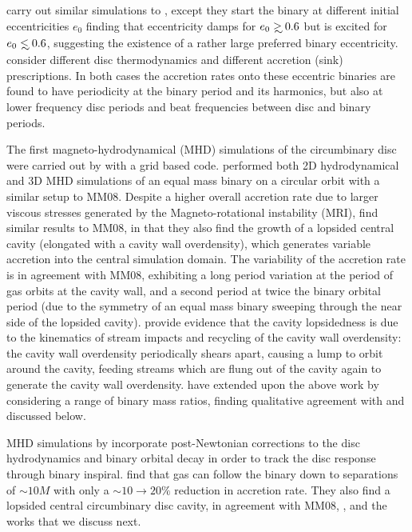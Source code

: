 \cite{Roedig:2012:Trqs} carry out similar simulations to \cite{Cuadra:2009}, except they start the binary at different initial eccentricities $e_0$ finding that eccentricity damps for $e_0 \gsim 0.6$ but is excited for $e_0 \lsim 0.6$, suggesting the existence of a rather large preferred binary eccentricity. \cite{Roedig:2011:eccevo} consider different disc thermodynamics and different accretion (sink) prescriptions. In both cases the accretion rates onto these eccentric binaries are found to have periodicity at the binary period and its harmonics, but also at lower frequency disc periods and beat frequencies between disc and binary periods.


The first magneto-hydrodynamical (MHD) simulations of the circumbinary disc
were carried out by \cite{ShiKrolik:2012} with a grid based code.
\cite{ShiKrolik:2012}  performed both 2D hydrodynamical and 3D MHD simulations
of an equal mass binary on a circular orbit with a similar setup to
MM08. Despite a higher overall accretion rate due to larger
viscous stresses generated by the Magneto-rotational instability (MRI),
\cite{ShiKrolik:2012} find similar results to MM08, in that they also find the
growth of a lopsided central cavity (elongated with a cavity wall
overdensity), which generates variable accretion into the central simulation
domain. The variability of the accretion rate is in agreement with MM08,
exhibiting a long period variation at the period of gas orbits at the cavity
wall, and a second period at twice the binary orbital period (due to the
symmetry of an equal mass binary sweeping through the near side of the lopsided
cavity). \cite{ShiKrolik:2012} provide evidence that the cavity lopsidedness is
due to the kinematics of stream impacts and recycling of the cavity wall
overdensity: the cavity wall overdensity periodically shears apart, causing a
lump to orbit around the cavity, feeding streams which are flung out of the
cavity again to generate the cavity wall overdensity. \cite{ShiKrolik:2015}
have extended upon the above work by considering a range of binary mass ratios,
finding qualitative agreement with \cite{DHM:2013:MNRAS} and \cite{Farris:2014}
discussed below.

MHD simulations by \cite{Noble+2012} incorporate post-Newtonian corrections
to the disc hydrodynamics and binary orbital decay in order to track the disc
response through binary inspiral. \cite{Noble+2012} find that gas can follow
the binary down to separations of $\sim10M$ with only a $\sim10 \rightarrow 20\%$
reduction in accretion rate. They also find a lopsided central circumbinary
disc cavity, in agreement with MM08, \cite{ShiKrolik:2012}, and the works
that we discuss next.

